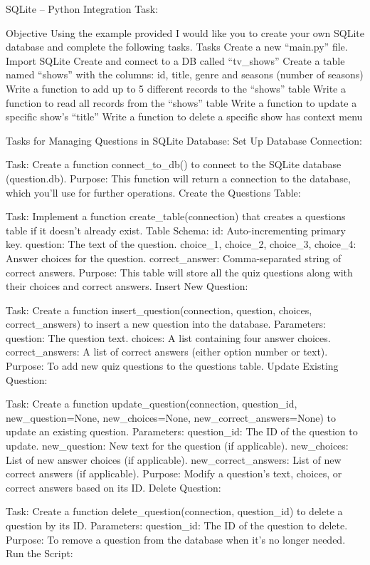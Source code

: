 

SQLite – Python Integration Task:
 
Objective
Using the example provided I would like you to create your own SQLite database and complete the following tasks.
Tasks
Create a new “main.py” file.
Import SQLite
Create and connect to a DB called “tv_shows”
Create a table named “shows” with the columns: id, title, genre and seasons (number of seasons)
Write a function to add up to 5 different records to the “shows” table
Write a function to read all records from the “shows” table
Write a function to update a specific show’s “title”
Write a function to delete a specific show
has context menu




Tasks for Managing Questions in SQLite Database:
Set Up Database Connection:

Task: Create a function connect_to_db() to connect to the SQLite database (question.db).
Purpose: This function will return a connection to the database, which you'll use for further operations.
Create the Questions Table:

Task: Implement a function create_table(connection) that creates a questions table if it doesn't already exist.
Table Schema:
id: Auto-incrementing primary key.
question: The text of the question.
choice_1, choice_2, choice_3, choice_4: Answer choices for the question.
correct_answer: Comma-separated string of correct answers.
Purpose: This table will store all the quiz questions along with their choices and correct answers.
Insert New Question:

Task: Create a function insert_question(connection, question, choices, correct_answers) to insert a new question into the database.
Parameters:
question: The question text.
choices: A list containing four answer choices.
correct_answers: A list of correct answers (either option number or text).
Purpose: To add new quiz questions to the questions table.
Update Existing Question:

Task: Create a function update_question(connection, question_id, new_question=None, new_choices=None, new_correct_answers=None) to update an existing question.
Parameters:
question_id: The ID of the question to update.
new_question: New text for the question (if applicable).
new_choices: List of new answer choices (if applicable).
new_correct_answers: List of new correct answers (if applicable).
Purpose: Modify a question's text, choices, or correct answers based on its ID.
Delete Question:

Task: Create a function delete_question(connection, question_id) to delete a question by its ID.
Parameters:
question_id: The ID of the question to delete.
Purpose: To remove a question from the database when it's no longer needed.
Run the Script:

